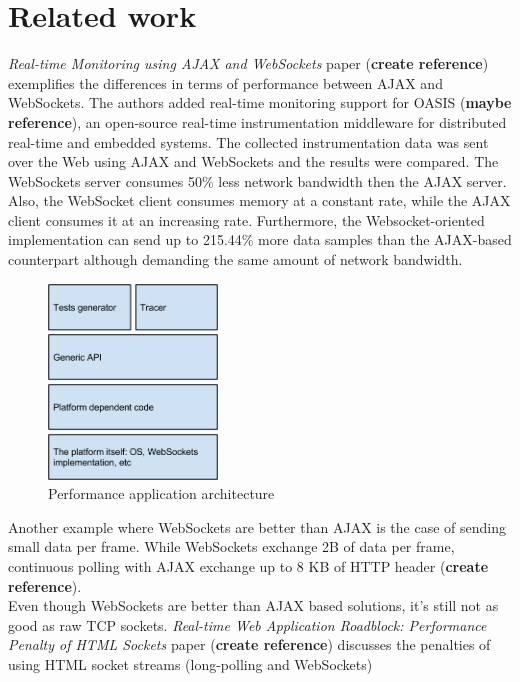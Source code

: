 \documentclass[conference]{IEEEtran}
\begin{document}
\section{Related work}
\textit{Real-time Monitoring using AJAX and WebSockets} paper (\textbf{create reference})
exemplifies the differences in terms of performance between AJAX and WebSockets.
The authors added real-time monitoring support for OASIS (\textbf{maybe reference}),
an open-source real-time instrumentation middleware for distributed real-time
and embedded systems. The collected instrumentation data was sent over the Web
using AJAX and WebSockets and the results were compared. The WebSockets server
consumes 50\% less network bandwidth then the AJAX server. Also, the WebSocket
client consumes memory at a constant rate, while the AJAX client consumes it
at an increasing rate. Furthermore, the Websocket-oriented implementation can
send up to 215.44\% more data samples than the AJAX-based counterpart although
demanding the same amount of network bandwidth. %
\\
\begin{frame}{}
  \begin{figure}
    \centering
    \includegraphics[width=0.4\textwidth]{Architecture.png}
    \caption{Performance application architecture}
  \end{figure}
\end{frame}
\indent
Another example where WebSockets are better than AJAX is the case of sending
small data per frame. While WebSockets exchange 2B of data per frame, continuous
polling with AJAX exchange up to 8 KB of HTTP header (\textbf{create reference}).
\\
\indent
Even though WebSockets are better than AJAX based solutions, it's still not as
good as raw TCP sockets. \textit{Real-time Web Application Roadblock:
Performance Penalty of HTML Sockets} paper (\textbf{create reference}) discusses
the penalties of using HTML socket streams (long-polling and WebSockets)
\end{document}
